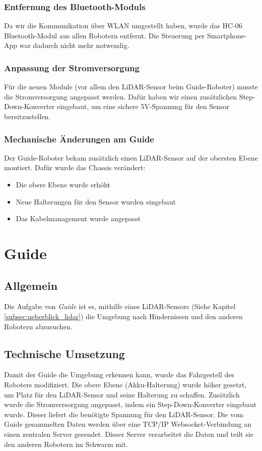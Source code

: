 \subsubsection{Entfernung des Bluetooth-Moduls}
Da wir die Kommunikation über WLAN umgestellt haben, wurde das HC-06 Bluetooth-Modul aus allen Robotern entfernt.
Die Steuerung per Smartphone-App war dadurch nicht mehr notwendig.
\subsubsection{Anpassung der Stromversorgung}
Für die neuen Module (vor allem den LiDAR-Sensor beim Guide-Roboter) musste die Stromversorgung angepasst werden.
Dafür haben wir einen zusätzlichen Step-Down-Konverter eingebaut, um eine sichere 5V-Spannung für den Sensor bereitzustellen.

\subsubsection{Mechanische Änderungen am Guide}
Der Guide-Roboter bekam zusätzlich einen LiDAR-Sensor auf der obersten Ebene montiert.
Dafür wurde das Chassis verändert:
\begin{itemize}
    \item Die obere Ebene wurde erhöht
    \item Neue Halterungen für den Sensor wurden eingebaut
    \item Das Kabelmanagement wurde angepasst
\end{itemize}






\section{Guide}
\label{subsec:hardware_guide}
\subsection{Allgemein}
Die Aufgabe von \textit{Guide} ist es,
mithilfe eines LiDAR-Sensors (Siehe Kapitel \ref{subsec:ueberblick_lidar}) die Umgebung nach Hindernissen
und den anderen Robotern abzusuchen.
%
\subsection{Technische Umsetzung}
Damit der Guide die Umgebung erkennen kann, wurde das Fahrgestell des Roboters modifiziert. Die obere Ebene (Akku-Halterung) wurde höher gesetzt, um Platz für den LiDAR-Sensor und seine Halterung zu schaffen. Zusätzlich wurde die Stromversorgung angepasst, indem ein Step-Down-Konverter eingebaut wurde. Dieser liefert die benötigte Spannung für den LiDAR-Sensor.
%
Die vom Guide gesammelten Daten werden über eine TCP/IP Websocket-Verbindung an einen zentralen Server gesendet. Dieser Server verarbeitet die Daten und teilt sie den anderen Robotern im Schwarm mit.
%

